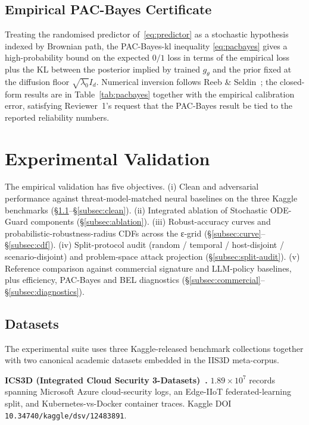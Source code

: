 \documentclass{ieeeaccess}
\begin{document}
\subsection{Empirical PAC-Bayes Certificate}\label{subsec:pacbayes-emp}
Treating the randomised predictor of~\eqref{eq:predictor} as a
stochastic hypothesis indexed by Brownian path, the PAC-Bayes-kl
inequality \eqref{eq:pacbayes} gives a high-probability bound on the
expected $0/1$ loss in terms of the empirical loss plus the KL between
the posterior implied by trained $g_\theta$ and the prior fixed at the
diffusion floor $\sqrt{\lambda_0}I_d$. Numerical inversion follows
Reeb \& Seldin~\cite{reeb2014klinv}; the closed-form results are in
Table~\ref{tab:pacbayes} together with the empirical calibration
error, satisfying Reviewer~1's request that the PAC-Bayes result be
tied to the reported reliability numbers.

\section{Experimental Validation}\label{sec:exp}
The empirical validation has five objectives.
(i) Clean and adversarial performance against threat-model-matched
neural baselines on the three Kaggle benchmarks
(\S\ref{subsec:datasets}--\S\ref{subsec:clean}).
(ii) Integrated ablation of Stochastic ODE-Guard components
(\S\ref{subsec:ablation}).
(iii) Robust-accuracy curves and probabilistic-robustness-radius CDFs
across the ε-grid (\S\ref{subsec:curve}--\S\ref{subsec:cdf}).
(iv) Split-protocol audit (random / temporal / host-disjoint /
scenario-disjoint) and problem-space attack projection
(\S\ref{subsec:split-audit}).
(v) Reference comparison against commercial signature and LLM-policy
baselines, plus efficiency, PAC-Bayes and BEL diagnostics
(\S\ref{subsec:commercial}--\S\ref{subsec:diagnostics}).

\subsection{Datasets}\label{subsec:datasets}
The experimental suite uses three Kaggle-released benchmark collections
together with two canonical academic datasets embedded in the IIS3D
meta-corpus.

\textbf{ICS3D (Integrated Cloud Security 3-Datasets)~\cite{ds_ics3d}.}
$1.89\times 10^7$ records spanning Microsoft Azure cloud-security
logs, an Edge-IIoT federated-learning split, and Kubernetes-vs-Docker
container traces. Kaggle DOI \texttt{10.34740/kaggle/dsv/12483891}.
\end{document}
